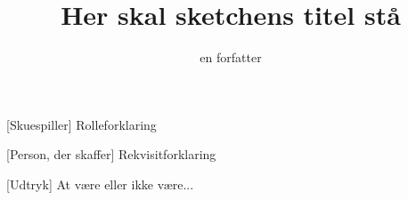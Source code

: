 \documentclass[a4paper,11pt]{article}
\title{Her skal sketchens titel stå}
\author{en forfatter}
\begin{document}
\maketitle

\begin{roles}
    [Skuespiller] Rolleforklaring
\end{roles}

\begin{props}
    [Person, der skaffer] Rekvisitforklaring
\end{props}


\begin{sketch}


[Udtryk] At være eller ikke være... 



\end{sketch}
\end{document}
